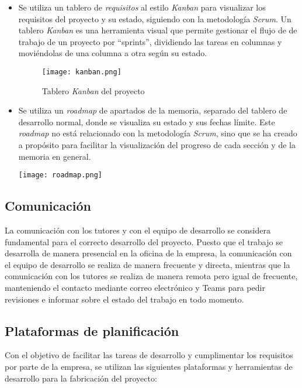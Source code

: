 \begin{itemize}
	\item Se utiliza un tablero de \textit{requisitos} al estilo \textit{Kanban}
		para visualizar los requisitos del proyecto y su estado, siguiendo con
		la metodología \textit{Scrum}. Un tablero \textit{Kanban} es una
		herramienta visual que permite gestionar el flujo de de trabajo de un
		proyecto por ``sprints'', dividiendo las tareas en columnas y
		moviéndolas de una columna a otra según su estado.

		\begin{figure}[H]
			\centering
			\texttt{[image: kanban.png]}
			\caption{Tablero \textit{Kanban} del proyecto}
			\label{fig:kanban}
		\end{figure}
	\item Se utiliza un \textit{roadmap} de apartados de la memoria, separado
		del tablero de desarrollo normal, donde se visualiza su estado y sus
		fechas límite. Este \textit{roadmap} no está relacionado con la
		metodología \textit{Scrum}, sino que se ha creado a propósito para
		facilitar la visualización del progreso de cada sección y de la memoria
		en general.

		\begin{minipage}{\linewidth}
			\centering
			\texttt{[image: roadmap.png]}
		\end{minipage}
\end{itemize}


\subsection{Comunicación}\label{subsec:comunicación}
La comunicación con los tutores y con el equipo de desarrollo se considera
fundamental para el correcto desarrollo del proyecto. Puesto que el trabajo se
desarrolla de manera presencial en la oficina de la empresa, la comunicación con
el equipo de desarrollo se realiza de manera frecuente y directa, mientras que
la comunicación con los tutores se realiza de manera remota pero igual de
frecuente, manteniendo el contacto mediante correo electrónico y Teams para
pedir revisiones e informar sobre el estado del trabajo en todo momento.

\subsection{Plataformas de planificación}\label{subsec:plataformas}
Con el objetivo de facilitar las tareas de desarrollo y cumplimentar los
requisitos por parte de la empresa, se utilizan las siguientes plataformas y
herramientas de desarrollo para la fabricación del proyecto:

